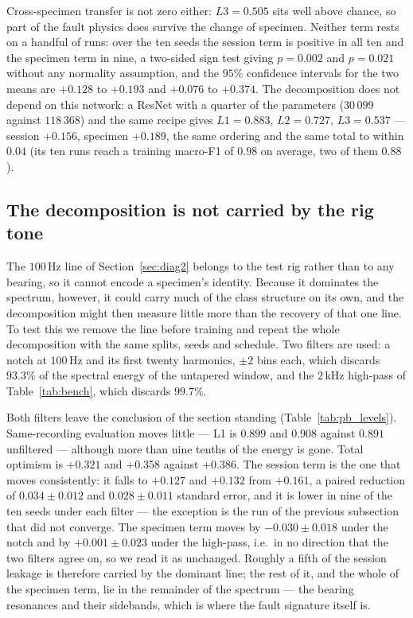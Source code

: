 \documentclass[journal]{IEEEtran}
\begin{document}
Cross-specimen transfer is not zero either: $L3 = 0.505$ sits well above
chance, so part of the fault physics does
survive the change of specimen. Neither term rests on a handful of runs: over
the ten seeds the session term is positive in all ten and the specimen term in
nine, a two-sided sign test giving $p = 0.002$ and $p = 0.021$ without any
normality assumption, and the $95\%$ confidence intervals for the two means are
$+0.128$ to $+0.193$ and $+0.076$ to $+0.374$. The decomposition does not depend on this network: a ResNet
with a quarter of the parameters ($30\,099$ against $118\,368$) and the same
recipe gives $L1 = 0.883$, $L2 = 0.727$, $L3 = 0.537$ --- session $+0.156$,
specimen $+0.189$, the same ordering and the same total to within $0.04$ (its
ten runs reach a training macro-F1 of $0.98$ on average, two of them $0.88$).

\subsection{The decomposition is not carried by the rig tone}
\label{sec:pb_filter}

The $100$\,Hz line of Section~\ref{sec:diag2} belongs to the test rig rather
than to any bearing, so it cannot encode a specimen's identity. Because it
dominates the spectrum, however, it could carry much of the class structure on
its own, and the decomposition might then measure little more than the recovery
of that one line. To test this we remove the line before training and repeat the
whole decomposition with the same splits, seeds and schedule. Two filters are used: a
notch at $100$\,Hz and its first twenty harmonics, $\pm2$ bins each, which
discards $93.3\%$ of the spectral energy of the untapered window, and the
$2$\,kHz high-pass of Table~\ref{tab:bench}, which discards $99.7\%$.

Both filters leave the conclusion of the section standing
(Table~\ref{tab:pb_levels}). Same-recording evaluation moves little --- L1 is
$0.899$ and $0.908$ against $0.891$ unfiltered --- although more than nine
tenths of the energy is gone. Total optimism is $+0.321$ and $+0.358$ against
$+0.386$. The session term is the one that moves consistently: it falls to
$+0.127$ and $+0.132$ from $+0.161$, a paired reduction of $0.034 \pm 0.012$
and $0.028 \pm 0.011$ standard error, and it is lower in nine of the ten seeds
under each filter --- the exception is the run of the previous subsection that
did not converge. The specimen term moves by $-0.030 \pm 0.018$ under the notch
and by $+0.001 \pm 0.023$ under the high-pass, i.e.\ in no direction that the
two filters agree on, so we read it as unchanged. Roughly a fifth of the session
leakage is therefore carried by the dominant line; the rest of it, and the
whole of the specimen term, lie in the remainder of the spectrum --- the bearing
resonances and their sidebands, which is where the fault signature itself is.
\end{document}
